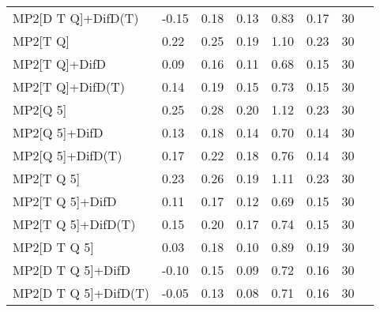 \begin{table}
\begin{tabular}{l l l l l l l l }
    MP2[D T Q]+DifD(T) & -0.15 & 0.18 & 0.13 & 0.83 & 0.17 & 30 \\ 
    MP2[T Q] & 0.22 & 0.25 & 0.19 & 1.10 & 0.23 & 30 \\ 
    MP2[T Q]+DifD & 0.09 & 0.16 & 0.11 & 0.68 & 0.15 & 30 \\ 
    MP2[T Q]+DifD(T) & 0.14 & 0.19 & 0.15 & 0.73 & 0.15 & 30 \\ 
    MP2[Q 5] & 0.25 & 0.28 & 0.20 & 1.12 & 0.23 & 30 \\ 
    MP2[Q 5]+DifD & 0.13 & 0.18 & 0.14 & 0.70 & 0.14 & 30 \\ 
    MP2[Q 5]+DifD(T) & 0.17 & 0.22 & 0.18 & 0.76 & 0.14 & 30 \\ 
    MP2[T Q 5] & 0.23 & 0.26 & 0.19 & 1.11 & 0.23 & 30 \\ 
    MP2[T Q 5]+DifD & 0.11 & 0.17 & 0.12 & 0.69 & 0.15 & 30 \\ 
    MP2[T Q 5]+DifD(T) & 0.15 & 0.20 & 0.17 & 0.74 & 0.15 & 30 \\ 
    MP2[D T Q 5] & 0.03 & 0.18 & 0.10 & 0.89 & 0.19 & 30 \\ 
    MP2[D T Q 5]+DifD & -0.10 & 0.15 & 0.09 & 0.72 & 0.16 & 30 \\ 
    MP2[D T Q 5]+DifD(T) & -0.05 & 0.13 & 0.08 & 0.71 & 0.16 & 30 \\ 
    \bottomrule
  \end{tabular}
\end{table}
